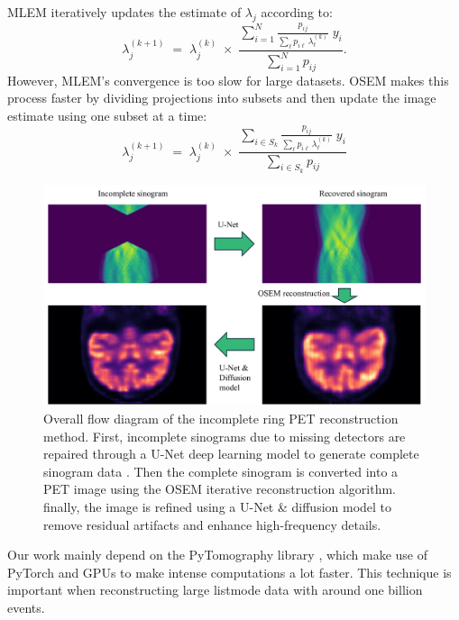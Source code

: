 \documentclass[12pt]{iopart}
\begin{document}
MLEM iteratively updates the estimate of $\lambda_j$ according to:
\begin{equation}
    \lambda_j^{(k+1)}
    \;=\;
    \lambda_j^{(k)}
    \;\times\;
    \frac{\displaystyle \sum_{i=1}^{N} \frac{p_{ij}}{\sum_{\ell} p_{i\ell}\,\lambda_{\ell}^{(k)}} \; y_i}
    {\displaystyle \sum_{i=1}^{N} p_{ij}}.
\end{equation}
However, MLEM's convergence is too slow for large datasets. OSEM makes this process faster by dividing projections into subsets and then update the image estimate using one subset at a time:
\begin{equation}
    \lambda_j^{(k+1)}
\;=\;
\lambda_j^{(k)}
\;\times\;
\frac{\displaystyle \sum_{i \in S_{k}} \frac{p_{ij}}{\sum_{\ell} p_{i\ell}\,\lambda_{\ell}^{(k)}} \; y_i}
{\displaystyle \sum_{i \in S_{k}} p_{ij}}
\end{equation}
\begin{figure}[ht]
    \centering
    \includegraphics[width=\textwidth]{Images/reconstruction_workflow}
    \vspace{-.5cm}
    \caption{Overall flow diagram of the incomplete ring PET reconstruction method. First, incomplete sinograms due to missing detectors are repaired through a U-Net deep learning model to generate complete sinogram data . Then the complete sinogram is converted into a PET image using the OSEM iterative reconstruction algorithm.  finally, the image is refined using a U-Net \& diffusion model to remove residual artifacts and enhance high-frequency details. 
    }
    \vspace{-.2cm}
    \label{fig:reconstruction_workflow}
\end{figure}
Our work mainly depend on the PyTomography library \cite{POLSON2025102020}, which make use of PyTorch and GPUs to make intense computations a lot faster. This technique is important when reconstructing large listmode data with around one billion events.
\end{document}
